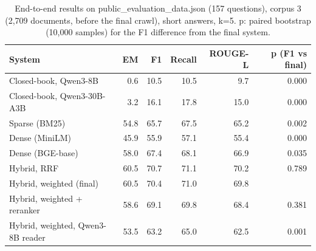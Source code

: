 \begin{table}[t]
\centering
\small
\begin{tabular}{lrrrrr}
\toprule
System & EM & F1 & Recall & ROUGE-L & p (F1 vs final) \\
\midrule
Closed-book, Qwen3-8B & 0.6 & 10.5 & 10.5 & 9.7 & 0.000 \\
Closed-book, Qwen3-30B-A3B & 3.2 & 16.1 & 17.8 & 15.0 & 0.000 \\
Sparse (BM25) & 54.8 & 65.7 & 67.5 & 65.2 & 0.002 \\
Dense (MiniLM) & 45.9 & 55.9 & 57.1 & 55.4 & 0.000 \\
Dense (BGE-base) & 58.0 & 67.4 & 68.1 & 66.9 & 0.035 \\
Hybrid, RRF & 60.5 & 70.7 & 71.1 & 70.2 & 0.789 \\
Hybrid, weighted (final) & 60.5 & 70.4 & 71.0 & 69.8 &  \\
Hybrid, weighted + reranker & 58.6 & 69.1 & 69.8 & 68.4 & 0.381 \\
Hybrid, weighted, Qwen3-8B reader & 53.5 & 63.2 & 65.0 & 62.5 & 0.001 \\
\bottomrule
\end{tabular}
\caption{End-to-end results on public\_evaluation\_data.json (157 questions), corpus 3 (2,709 documents, before the final crawl), short answers, k=5. p: paired bootstrap (10,000 samples) for the F1 difference from the final system.}
\label{tab:ablations}
\end{table}
